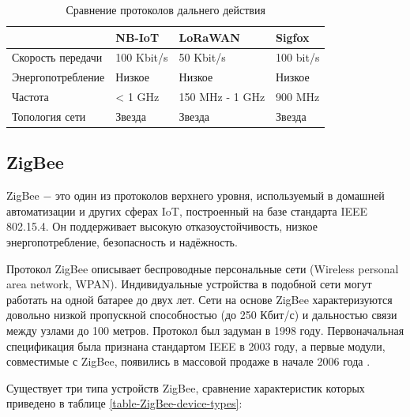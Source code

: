    \begin{table}[h]
   	\centering
   	\begin{tabular}{ | l | l | l | l |}
   		\hline
   		& NB-IoT & LoRaWAN & Sigfox \\ \hline
   		Скорость передачи & 100 Kbit/s & 50 Kbit/s & 100 bit/s \\ \hline
   		Энергопотребление & Низкое & Низкое & Низкое \\ \hline
   		Частота & < 1 GHz  & 150 MHz - 1 GHz & 900 MHz \\ \hline
   		Топология сети & Звезда & Звезда & Звезда \\
   		\hline
   	\end{tabular}
   	\caption{Сравнение протоколов дальнего действия}
   	\label{table-long-range-solutions}
   \end{table}
	

	\subsection{ZigBee}
	ZigBee $-$ это один из протоколов верхнего уровня, используемый в домашней автоматизации и других
	сферах IoT, построенный на базе стандарта IEEE 802.15.4. Он поддерживает высокую отказоустойчивость, 
	низкое энергопотребление, безопасность и надёжность.
	
	Протокол ZigBee описывает беспроводные персональные сети (Wireless personal area network, WPAN).
	Индивидуальные устройства в подобной сети могут работать на одной батарее до двух лет.
	Сети на основе ZigBee характеризуются довольно низкой пропускной способностью (до 250 Кбит/с) и
	дальностью связи между узлами до 100 метров. Протокол был задуман в 1998 году. Первоначальная 
	спецификация была признана стандартом IEEE в 2003 году, а первые модули, совместимые с ZigBee, 
	появились в массовой продаже в начале 2006 года \cite{zigbee-certified-products}.
	
	Существует три типа устройств ZigBee, сравнение характеристик которых приведено в таблице \ref{table-ZigBee-device-types}:
	
